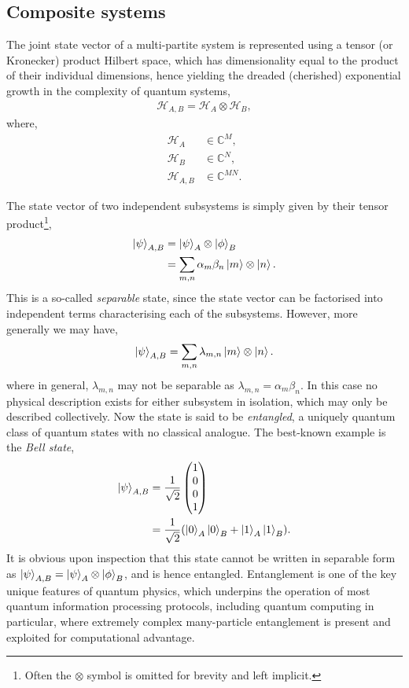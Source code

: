 \documentclass[aps,pra,twocolumn,amsmath,amssymb,nofootinbib,superscriptaddress]{revtex4}
\begin{document}
%
%

\subsection{Composite systems}

The joint state vector of a multi-partite system is represented using a tensor (or Kronecker) product Hilbert space, which has dimensionality equal to the product of their individual dimensions, hence yielding the dreaded (cherished) exponential growth in the complexity of quantum systems,
\begin{align}
\mathcal{H}_{A,B} = \mathcal{H}_A\otimes \mathcal{H}_B,	
\end{align}
where,
\begin{align}
\mathcal{H}_A &\in\mathbb{C}^M,\nonumber\\
\mathcal{H}_B &\in\mathbb{C}^N,\nonumber\\
\mathcal{H}_{A,B} &\in\mathbb{C}^{MN}.	
\end{align}

The state vector of two independent subsystems is simply given by their tensor product\footnote{Often the $\otimes$ symbol is omitted for brevity and left implicit.},
\begin{align}
\ket\psi_{A,B} &= \ket\psi_A \otimes \ket\phi_B\nonumber\\
&=\sum_{m,n} \alpha_m\beta_n\ket{m}\otimes\ket{n}.
\end{align}
This is a so-called \textit{separable} state, since the state vector can be factorised into independent terms characterising each of the subsystems. However, more generally we may have,
\begin{align}
\ket\psi_{A,B} =\sum_{m,n} \lambda_{m,n}\ket{m}\otimes\ket{n}.
\end{align}
where in general, $\lambda_{m,n}$ may not be separable as \mbox{$\lambda_{m,n}=\alpha_m\beta_n$}. In this case no physical description exists for either subsystem in isolation, which may only be described collectively. Now the state is said to be \textit{entangled}, a uniquely quantum class of quantum states with no classical analogue. The best-known example is the \textit{Bell state},
\begin{align}\label{eq:bell_state_vec_def}
\ket\psi_{A,B} &= \frac{1}{\sqrt{2}}\left(\begin{matrix}{}
  1\\
  0\\
  0\\
  1
\end{matrix}\right)\nonumber\\
&= \frac{1}{\sqrt{2}}(\ket{0}_A\ket{0}_B+\ket{1}_A\ket{1}_B).
\end{align}
It is obvious upon inspection that this state cannot be written in separable form as \mbox{$\ket\psi_{A,B} = \ket\psi_A \otimes \ket\phi_B$}, and is hence entangled. Entanglement is one of the key unique features of quantum physics, which underpins the operation of most quantum information processing protocols, including quantum computing in particular, where extremely complex many-particle entanglement is present and exploited for computational advantage.
\end{document}
